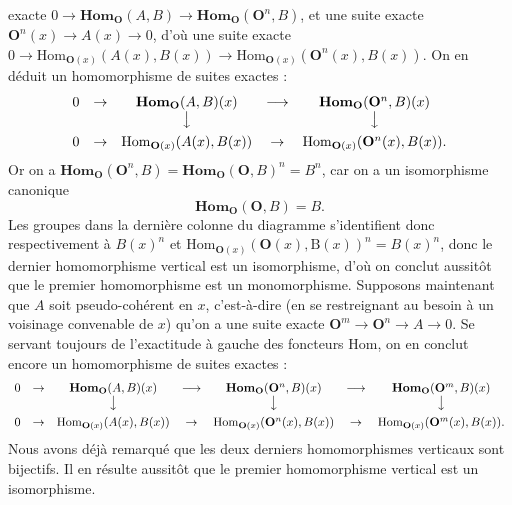 \clearpage
{}

\noindent exacte
$0\to\mathbf{Hom}_{\mathbf O}(A,B)\to
\mathbf{Hom}_{\mathbf O}({\mathbf O}^n,B)$, et une suite exacte
${\mathbf O}^n(x)\to A(x)\to0$, d'où une suite exacte
$0\to\mathrm{Hom}_{{\mathbf O}(x)}(A(x),B(x))\to
\mathrm{Hom}_{{\mathbf O}(x)}({\mathbf O}^n(x),B(x))$. On en déduit un homomorphisme de suites
exactes :
\[
\begin{array}{ccccc}
0&\to&\mathbf{Hom}_{\mathbf O}(A,B)(x)&\longrightarrow&
  \mathbf{Hom}_{\mathbf O}({\mathbf O}^n,B)(x)\\
&&\big\downarrow&&\big\downarrow\\[0.45em]
0&\to&\mathrm{Hom}_{{\mathbf O}(x)}(A(x),B(x))&\to&
  \mathrm{Hom}_{{\mathbf O}(x)}({\mathbf O}^n(x),B(x)).
\end{array}
\]
Or on a $\mathbf{Hom}_{\mathbf O}({\mathbf O}^n,B)=\mathbf{Hom}_{\mathbf O}({\mathbf O},B)^n=B^n$, car on a un
isomorphisme canonique
\[
\tag{4.1.4}
\mathbf{Hom}_{\mathbf O}({\mathbf O},B)=B.
\]
Les groupes dans la dernière colonne du diagramme s'identifient donc
respectivement à $B(x)^n$ et
$\mathrm{Hom}_{{\mathbf O}(x)}({\mathbf O}(x),\mathrm B(x))^n=B(x)^n$, donc le dernier homomorphisme
vertical est un isomorphisme, d'où on conclut aussitôt que le premier
homomorphisme est un monomorphisme. Supposons maintenant que $A$ soit
pseudo-cohérent en $x$, c'est-à-dire (en se restreignant au besoin à un
voisinage convenable de $x$) qu'on a une suite exacte
${\mathbf O}^m\to {\mathbf O}^n\to A\to0$. Se servant
toujours de l'exactitude à gauche des foncteurs $\mathrm{Hom}$, on en conclut
encore un homomorphisme de suites exactes :
\[
\begin{array}{ccccccc}
0&\to&\mathbf{Hom}_{\mathbf O}(A,B)(x)&\longrightarrow&
  \mathbf{Hom}_{\mathbf O}({\mathbf O}^n,B)(x)&\longrightarrow&\mathbf{Hom}_{\mathbf O}({\mathbf O}^m,B)(x)\\
&&\big\downarrow&&\big\downarrow&&\big\downarrow\\[0.45em]
0&\to&\mathrm{Hom}_{{\mathbf O}(x)}(A(x),B(x))&\to&
  \mathrm{Hom}_{{\mathbf O}(x)}({\mathbf O}^n(x),B(x))&\to&
  \mathrm{Hom}_{{\mathbf O}(x)}({\mathbf O}^m(x),B(x)).
\end{array}
\]
Nous avons déjà remarqué que les deux derniers homomorphismes verticaux sont
bijectifs. Il en résulte aussitôt que le premier homomorphisme vertical est un
isomorphisme.

